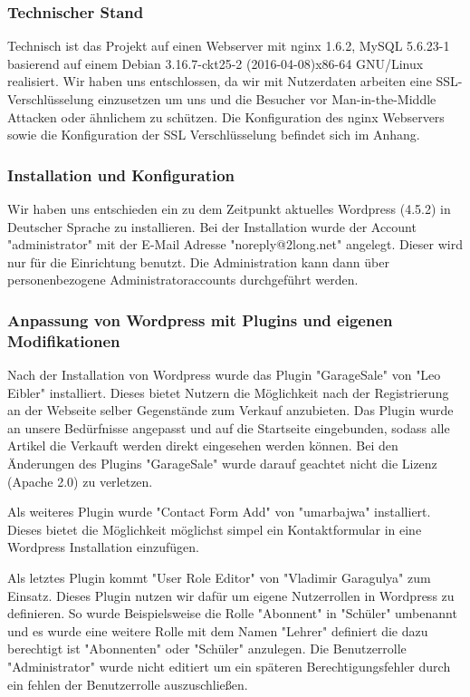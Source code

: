\documentclass[a4paper, DIV20, 11pt, headsepline, parskip]{article}
\begin{document}
\subsubsection{Technischer Stand}
Technisch ist das Projekt auf einen Webserver mit nginx 1.6.2,
MySQL 5.6.23-1 basierend auf einem
Debian 3.16.7-ckt25-2 (2016-04-08)x86-64 GNU/Linux 
realisiert.
Wir haben uns entschlossen, da wir mit Nutzerdaten arbeiten eine SSL-Verschlüsselung einzusetzen um uns und die Besucher vor Man-in-the-Middle Attacken oder ähnlichem zu schützen.
Die Konfiguration des nginx Webservers sowie die Konfiguration der SSL Verschlüsselung befindet sich im Anhang.
\subsubsection{Installation und Konfiguration}
Wir haben uns entschieden ein zu dem Zeitpunkt aktuelles Wordpress (4.5.2) in Deutscher Sprache zu installieren.
Bei der Installation wurde der Account "administrator" mit der E-Mail Adresse "noreply@2long.net" angelegt.
Dieser wird nur für die Einrichtung benutzt.
Die Administration kann dann über personenbezogene Administratoraccounts durchgeführt werden.
\subsubsection{Anpassung von Wordpress mit Plugins und eigenen Modifikationen}
Nach der Installation von Wordpress wurde das Plugin "GarageSale" von "Leo Eibler" installiert.
Dieses bietet Nutzern die Möglichkeit nach der Registrierung an der Webseite selber Gegenstände zum Verkauf anzubieten.
Das Plugin wurde an unsere Bedürfnisse angepasst und auf die Startseite eingebunden, sodass alle Artikel die Verkauft werden direkt eingesehen werden können.
Bei den Änderungen des Plugins "GarageSale" wurde darauf geachtet nicht die Lizenz (Apache 2.0) zu verletzen.

Als weiteres Plugin wurde "Contact Form Add" von "umarbajwa" installiert.
Dieses bietet die Möglichkeit möglichst simpel ein Kontaktformular in eine Wordpress Installation einzufügen.

Als letztes Plugin kommt "User Role Editor" von "Vladimir Garagulya" zum Einsatz.
Dieses Plugin nutzen wir dafür um eigene Nutzerrollen in Wordpress zu definieren.
So wurde Beispielsweise die Rolle "Abonnent" in "Schüler" umbenannt und es wurde eine weitere Rolle mit dem Namen "Lehrer" definiert die dazu berechtigt ist "Abonnenten" oder "Schüler" anzulegen.
Die Benutzerrolle "Administrator" wurde nicht editiert um ein späteren Berechtigungsfehler durch ein fehlen der Benutzerrolle auszuschließen.
\end{document}
